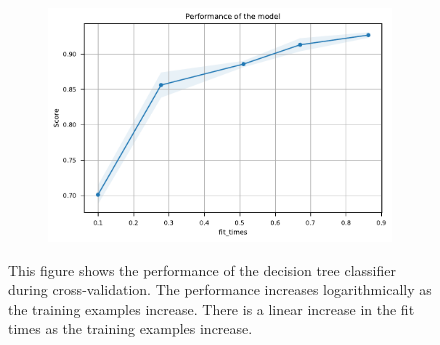 \documentclass{l4proj}
\begin{document}
\begin{figure}[htbp]
\begin{subfigure}[b]{0.70\textwidth}
        \includegraphics[width=\textwidth]{images/sessions/learning_curve_3_DecisionTreeSessions.pdf}
        \caption{}
        \label{fig:learning_curve_3_DecisionTreeSessions}
    \end{subfigure}
    \caption{This figure shows the performance of the decision tree classifier during cross-validation. The performance increases logarithmically as the training examples increase. There is a linear increase in the fit times as the training examples increase.}\label{fig:session_learning_curve_dtree}
\end{figure}
\end{document}
